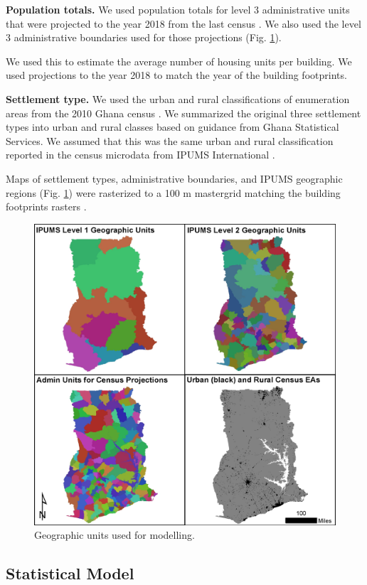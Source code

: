 \documentclass[]{book}
\begin{document}
\textbf{Population totals.} We used population totals for level 3
administrative units that were projected to the year 2018 from the last
census \citep{worldpop2018globala}. We also used the level 3
administrative boundaries used for those projections
\citep{worldpop2018globalb} (Fig. \ref{fig:map}).

We used this to estimate the average number of housing units per
building. We used projections to the year 2018 to match the year of the
building footprints.

\textbf{Settlement type.} We used the urban and rural classifications of
enumeration areas from the 2010 Ghana census \citep{gss2010census}. We
summarized the original three settlement types into urban and rural
classes based on guidance from Ghana Statistical Services. We assumed
that this was the same urban and rural classification reported in the
census microdata from IPUMS International \citep{mpc2019integrated}.

Maps of settlement types, administrative boundaries, and IPUMS
geographic regions (Fig. \ref{fig:map}) were rasterized to a 100 m
mastergrid matching the building footprints rasters
\citep{dooley2020gridded}.

\begin{figure}

{\centering \includegraphics[width=0.6\linewidth]{dat/GHAv1/map} 

}

\caption{Geographic units used for modelling.}\label{fig:map}
\end{figure}

\subsection{Statistical Model}\label{statistical-model}
\end{document}

